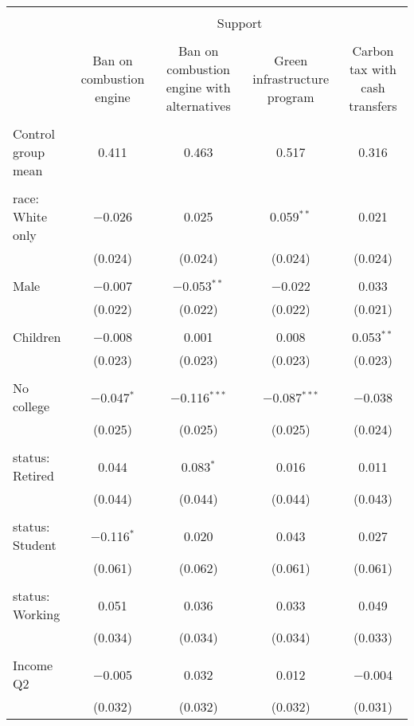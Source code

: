 
\begin{tabular}{@{\extracolsep{5pt}}lcccc} 
\\[-1.8ex]\hline 
\hline \\[-1.8ex] 
 & \multicolumn{4}{c}{Support} \\ 
\cline{2-5} 
\\[-1.8ex] & Ban on combustion engine & Ban on combustion engine with alternatives & Green infrastructure program & Carbon tax with cash transfers \\ 
\hline \\[-1.8ex] 
 Control group mean & 0.411 & 0.463 & 0.517 & 0.316  \\ \hline \\[-1.8ex] race: White only & $-$0.026 & 0.025 & 0.059$^{**}$ & 0.021 \\ 
  & (0.024) & (0.024) & (0.024) & (0.024) \\ 
  & & & & \\ 
 Male & $-$0.007 & $-$0.053$^{**}$ & $-$0.022 & 0.033 \\ 
  & (0.022) & (0.022) & (0.022) & (0.021) \\ 
  & & & & \\ 
 Children & $-$0.008 & 0.001 & 0.008 & 0.053$^{**}$ \\ 
  & (0.023) & (0.023) & (0.023) & (0.023) \\ 
  & & & & \\ 
 No college & $-$0.047$^{*}$ & $-$0.116$^{***}$ & $-$0.087$^{***}$ & $-$0.038 \\ 
  & (0.025) & (0.025) & (0.025) & (0.024) \\ 
  & & & & \\ 
 status: Retired & 0.044 & 0.083$^{*}$ & 0.016 & 0.011 \\ 
  & (0.044) & (0.044) & (0.044) & (0.043) \\ 
  & & & & \\ 
 status: Student & $-$0.116$^{*}$ & 0.020 & 0.043 & 0.027 \\ 
  & (0.061) & (0.062) & (0.061) & (0.061) \\ 
  & & & & \\ 
 status: Working & 0.051 & 0.036 & 0.033 & 0.049 \\ 
  & (0.034) & (0.034) & (0.034) & (0.033) \\ 
  & & & & \\ 
 Income Q2 & $-$0.005 & 0.032 & 0.012 & $-$0.004 \\ 
  & (0.032) & (0.032) & (0.032) & (0.031) \\ 

\end{tabular}
